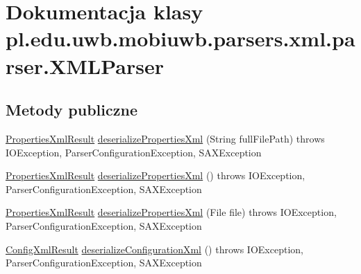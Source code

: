 \hypertarget{classpl_1_1edu_1_1uwb_1_1mobiuwb_1_1parsers_1_1xml_1_1parser_1_1_x_m_l_parser}{}\section{Dokumentacja klasy pl.\+edu.\+uwb.\+mobiuwb.\+parsers.\+xml.\+parser.\+X\+M\+L\+Parser}
\label{classpl_1_1edu_1_1uwb_1_1mobiuwb_1_1parsers_1_1xml_1_1parser_1_1_x_m_l_parser}
\subsection*{Metody publiczne}
\begin{DoxyCompactItemize}
\item 
\hyperlink{classpl_1_1edu_1_1uwb_1_1mobiuwb_1_1parsers_1_1xml_1_1parser_1_1result_1_1model_1_1_properties_xml_result}{Properties\+Xml\+Result} \hyperlink{classpl_1_1edu_1_1uwb_1_1mobiuwb_1_1parsers_1_1xml_1_1parser_1_1_x_m_l_parser_ae24ff802d3bf78080423dcfdeed663d2}{deserialize\+Properties\+Xml} (String full\+File\+Path)  throws I\+O\+Exception,             Parser\+Configuration\+Exception,             S\+A\+X\+Exception     
\item 
\hyperlink{classpl_1_1edu_1_1uwb_1_1mobiuwb_1_1parsers_1_1xml_1_1parser_1_1result_1_1model_1_1_properties_xml_result}{Properties\+Xml\+Result} \hyperlink{classpl_1_1edu_1_1uwb_1_1mobiuwb_1_1parsers_1_1xml_1_1parser_1_1_x_m_l_parser_af5c7be7ed7834f285bdb3db95d148b6a}{deserialize\+Properties\+Xml} ()  throws I\+O\+Exception,             Parser\+Configuration\+Exception,             S\+A\+X\+Exception     
\item 
\hyperlink{classpl_1_1edu_1_1uwb_1_1mobiuwb_1_1parsers_1_1xml_1_1parser_1_1result_1_1model_1_1_properties_xml_result}{Properties\+Xml\+Result} \hyperlink{classpl_1_1edu_1_1uwb_1_1mobiuwb_1_1parsers_1_1xml_1_1parser_1_1_x_m_l_parser_ad2e8000c86d68d6ed2caec036886b99f}{deserialize\+Properties\+Xml} (File file)  throws I\+O\+Exception,             Parser\+Configuration\+Exception,             S\+A\+X\+Exception     
\item 
\hyperlink{classpl_1_1edu_1_1uwb_1_1mobiuwb_1_1parsers_1_1xml_1_1parser_1_1_config_xml_result}{Config\+Xml\+Result} \hyperlink{classpl_1_1edu_1_1uwb_1_1mobiuwb_1_1parsers_1_1xml_1_1parser_1_1_x_m_l_parser_a844d291ff36027b48452724bec972975}{deserialize\+Configuration\+Xml} ()  throws I\+O\+Exception,             Parser\+Configuration\+Exception,             S\+A\+X\+Exception     

\end{DoxyCompactItemize}
